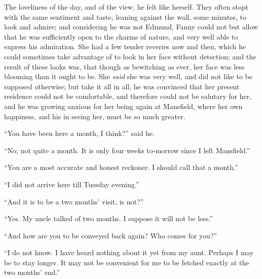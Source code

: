 \documentclass{article}
\begin{document}
The loveliness of the day, and of the view, he felt
like herself.  They often stopt with the same sentiment
and taste, leaning against the wall, some minutes,
to look and admire; and considering he was not Edmund,
Fanny could not but allow that he was sufficiently open
to the charms of nature, and very well able to express
his admiration.  She had a few tender reveries now and then,
which he could sometimes take advantage of to look in her
face without detection; and the result of these looks was,
that though as bewitching as ever, her face was less
blooming than it ought to be.  She \emph{said} she was
very well, and did not like to be supposed otherwise;
but take it all in all, he was convinced that her present
residence could not be comfortable, and therefore could
not be salutary for her, and he was growing anxious for
her being again at Mansfield, where her own happiness,
and his in seeing her, must be so much greater.

``You have been here a month, I think?'' said he.

``No; not quite a month.  It is only four weeks to-morrow
since I left Mansfield.''

``You are a most accurate and honest reckoner.  I should
call that a month.''

``I did not arrive here till Tuesday evening.''

``And it is to be a two months' visit, is not?''

``Yes.  My uncle talked of two months.  I suppose it
will not be less.''

``And how are you to be conveyed back again?  Who comes
for you?''

``I do not know.  I have heard nothing about it yet
from my aunt.  Perhaps I may be to stay longer.
It may not be convenient for me to be fetched exactly
at the two months' end.''
\end{document}
